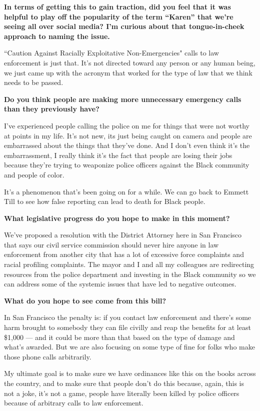 \textbf{In terms of getting this to gain traction, did you feel that it
was helpful to play off the popularity of the term ``Karen'' that we're
seeing all over social media? I'm curious about that tongue-in-cheek
approach to naming the issue.}

``Caution Against Racially Exploitative Non-Emergencies" calls to law
enforcement is just that. It's not directed toward any person or any
human being, we just came up with the acronym that worked for the type
of law that we think needs to be passed.

\textbf{Do you think people are making more unnecessary emergency calls
than they previously have?}

I've experienced people calling the police on me for things that were
not worthy at points in my life. It's not new, its just being caught on
camera and people are embarrassed about the things that they've done.
And I don't even think it's the embarrassment, I really think it's the
fact that people are losing their jobs because they're trying to
weaponize police officers against the Black community and people of
color.

It's a phenomenon that's been going on for a while. We can go back to
Emmett Till to see how false reporting can lead to death for Black
people.

\textbf{What legislative progress do you hope to make in this moment?}

We've proposed a resolution with the District Attorney here in San
Francisco that says our civil service commission should never hire
anyone in law enforcement from another city that has a lot of excessive
force complaints and racial profiling complaints. The mayor and I and
all my colleagues are redirecting resources from the police department
and investing in the Black community so we can address some of the
systemic issues that have led to negative outcomes.

\textbf{What do you hope to see come from this bill?}

In San Francisco the penalty is: if you contact law enforcement and
there's some harm brought to somebody they can file civilly and reap the
benefits for at least \$1,000 --- and it could be more than that based
on the type of damage and what's awarded. But we are also focusing on
some type of fine for folks who make those phone calls arbitrarily.

My ultimate goal is to make sure we have ordinances like this on the
books across the country, and to make sure that people don't do this
because, again, this is not a joke, it's not a game, people have
literally been killed by police officers because of arbitrary calls to
law enforcement.


